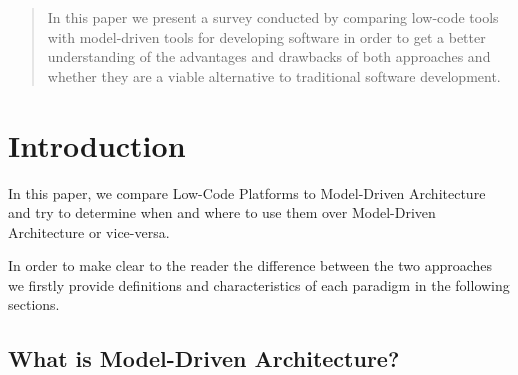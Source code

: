 \documentclass[runningheads]{llncs}
\begin{document}

\maketitle

\vspace{8em}

\begin{abstract}

In this paper we present a survey conducted by comparing low-code tools with model-driven tools for developing software in order to get a better understanding of the advantages and drawbacks of both approaches and whether they are a viable alternative to traditional software development.


\end{abstract}

\newpage

\section{Introduction}
\label{sec:introduction}

In this paper, we compare Low-Code Platforms to Model-Driven Architecture and try to determine when and where to use them over Model-Driven Architecture or vice-versa.

In order to make clear to the reader the difference between the two approaches we firstly provide definitions and characteristics of each paradigm in the following sections.

\subsection{What is Model-Driven Architecture?}
\label{ssec:what_is_model_driven}
\end{document}
